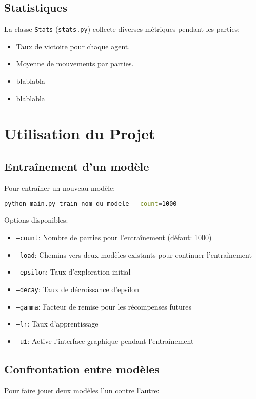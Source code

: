 \documentclass[]{article}
\begin{document}
\subsection{Statistiques}
La classe \texttt{Stats} (\texttt{stats.py}) collecte diverses métriques pendant les parties:
\begin{itemize} %
  \item Taux de victoire pour chaque agent.
  \item Moyenne de mouvements par parties.
  \item blablabla
  \item blablabla
\end{itemize}

\section{Utilisation du Projet}

\subsection{Entraînement d'un modèle}
Pour entraîner un nouveau modèle:

\begin{lstlisting}[language=bash]
python main.py train nom_du_modele --count=1000
\end{lstlisting}

Options disponibles:
\begin{itemize}
  \item \texttt{--count}: Nombre de parties pour l'entraînement (défaut: 1000)
  \item \texttt{--load}: Chemins vers deux modèles existants pour continuer l'entraînement
  \item \texttt{--epsilon}: Taux d'exploration initial
  \item \texttt{--decay}: Taux de décroissance d'epsilon
  \item \texttt{--gamma}: Facteur de remise pour les récompenses futures
  \item \texttt{--lr}: Taux d'apprentissage
  \item \texttt{--ui}: Active l'interface graphique pendant l'entraînement
\end{itemize}

\subsection{Confrontation entre modèles}
Pour faire jouer deux modèles l'un contre l'autre:
\end{document}
